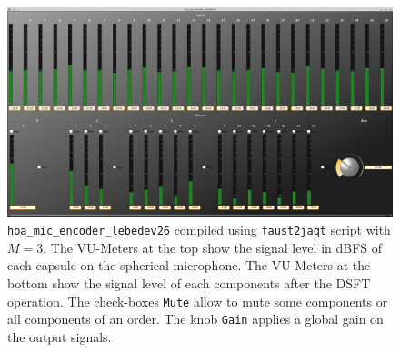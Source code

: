 \documentclass[10pt,a4paper]{article}
\begin{document}
\begin{figure}[!ht]
\includegraphics[width=\columnwidth]{hoa_mic_encoder.png}
\caption{\lstinline'hoa_mic_encoder_lebedev26' compiled using \lstinline'faust2jaqt' script with $M=3$. The VU-Meters at the top show the signal level in dBFS of each capsule on the spherical microphone. The VU-Meters at the bottom show the signal level of each components after the DSFT operation. The check-boxes \lstinline'Mute' allow to mute some components or all components of an order. The knob \lstinline'Gain' applies a global gain on the output signals.}
\label{fig:hoa_mic_encoder_lebedev26}
\end{figure}
\end{document}
